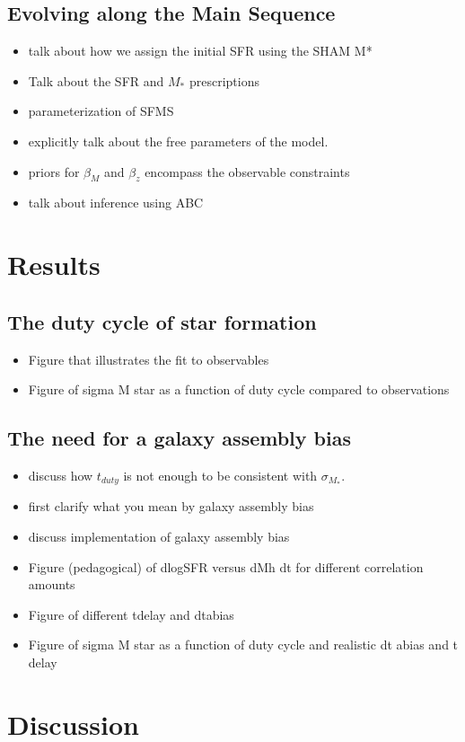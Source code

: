 \documentclass[12pt, letterpaper, preprint]{aastex}
\newcommand{\bitem}{\begin{itemize}}
\newcommand{\eitem}{\end{itemize}}
\begin{document}
\subsection{Evolving along the Main Sequence} 
\bitem
\item talk about how we assign the initial SFR using the SHAM M*
\item Talk about the SFR and $M_*$ prescriptions 
\item parameterization of SFMS 
\item explicitly talk about the free parameters of the model. 
\item priors for $\beta_M$ and $\beta_z$ encompass the observable constraints 
\item talk about inference using ABC
\eitem

\section{Results}
\subsection{The duty cycle of star formation}
\bitem
\item Figure that illustrates the fit to observables 
\item Figure of sigma M star as a function of duty cycle compared to observations 
\eitem 

\subsection{The need for a galaxy assembly bias}
\bitem
\item discuss how $t_{duty}$ is not enough to be consistent with $\sigma_{M_*}$. 
\item first clarify what you mean by galaxy assembly bias 
\item discuss implementation of galaxy assembly bias
\item Figure (pedagogical) of dlogSFR versus dMh dt for different correlation amounts 
\item Figure of different tdelay and dtabias 
\item Figure of sigma M star as a function of duty cycle and realistic dt abias and t delay 
\eitem

\section{Discussion} \label{sec:discussion}
\end{document}
